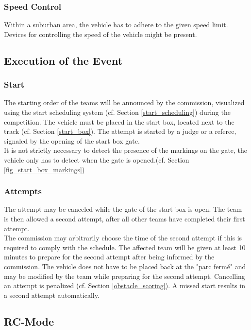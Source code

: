 \subsubsection{Speed Control}

Within a suburban area, the vehicle has to adhere to the given speed limit.
Devices for controlling the speed of the vehicle might be present.

\subsection{Execution of the Event}

\subsubsection{Start}

The starting order of the teams will be announced by the commission, visualized
using the start scheduling system (cf. Section \ref{start_scheduling}) during
the competition. The vehicle must be placed in the start box, located next to
the track (cf. Section \ref{start_box}). The attempt is started by a judge or a
referee, signaled by the opening of the start box gate.\\ It is not strictly
necessary to detect the presence of the markings on the gate, the vehicle only
has to detect when the gate is opened.(cf. Section
\ref{fig_start_box_markings})

\subsubsection{Attempts}

The attempt may be canceled while the gate of the start box is open. The team
is then allowed a second attempt, after all other teams have completed their
first attempt.\\ The commission may arbitrarily choose the time of the second
attempt if this is required to comply with the schedule. The affected team will
be given at least 10 minutes to prepare for the second attempt after being
informed by the commission. The vehicle does not have to be placed back at the
"parc fermé" and may be modified by the team while preparing for the second
attempt. Cancelling an attempt is penalized (cf. Section
\ref{obstacle_scoring}). A missed start results in a second attempt
automatically.

\subsection{RC-Mode}

